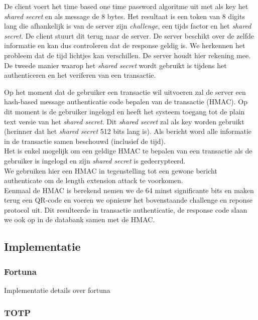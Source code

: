 \documentclass[11pt]{article}
\begin{document}
De client voert het time based one time password algoritme uit met als key het \emph{shared secret} en als message de 8 bytes. Het resultaat is een token van 8 digits lang die afhankelijk is van de server zijn \emph{challenge}, een tijds factor en het \emph{shared secret}. De client stuurt dit terug naar de server. De server beschikt over de zelfde informatie en kan dus controleren dat de response geldig is. We herkennen het probleem dat de tijd lichtjes kan verschillen. De server houdt hier rekening mee.\\

De tweede manier waarop het \emph{shared secret} wordt gebruikt is tijdens het authenticeren en het veriferen van een transactie.

Op het moment dat de gebruiker een transactie wil uitvoeren zal de server een hash-based message authenticatie code bepalen van de transactie (HMAC). Op dit moment is de gebruiker ingelogd en heeft het systeem toegang tot de plain text versie van het \emph{shared secret}. Dit \emph{shared secret} zal als key worden gebruikt (herinner dat het \emph{shared secret} 512 bits lang is). Als bericht word alle informatie in de transactie samen beschouwd (inclusief de tijd). \\

Het is enkel mogelijk om een geldige HMAC te bepalen van een transactie als de gebruiker is ingelogd en zijn \emph{shared secret} is gedecrypteerd.\\

We gebruiken hier een HMAC in tegenstelling tot een gewone bericht authenticate om de length extension attack te voorkomen.\\

Eenmaal de HMAC is berekend nemen we de 64 minst significante bits en maken terug een QR-code en voeren we opnieuw het bovenstaande challenge en reponse protocol uit. Dit resulteerde in transactie authenticatie, de response code slaan we ook op in de databank samen met de HMAC.
\subsection{Implementatie}
\subsubsection{Fortuna}
\label{sec:fortuna}
Implementatie details over fortuna
\subsubsection{TOTP}
\end{document}
